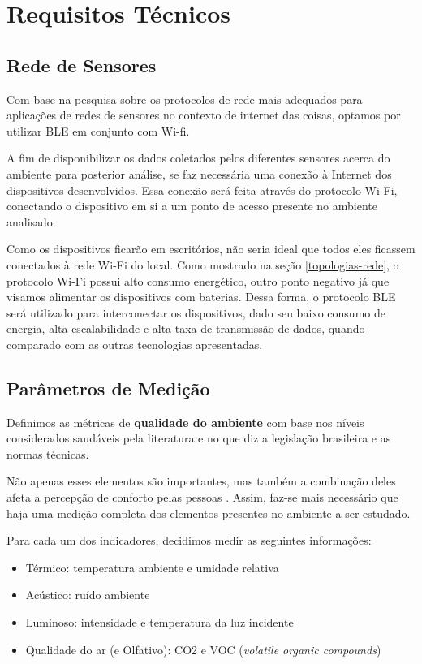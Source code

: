 \documentclass[../monografia.tex]{subfiles}
\begin{document}
\section{Requisitos Técnicos}

\subsection{Rede de Sensores}

Com base na pesquisa sobre os protocolos de rede mais adequados para aplicações de redes de sensores no contexto de internet das coisas, optamos por utilizar BLE em conjunto com Wi-fi. 

A fim de disponibilizar os dados coletados pelos diferentes sensores acerca do ambiente para posterior análise, se faz necessária uma conexão à Internet dos dispositivos desenvolvidos. Essa conexão será feita através do protocolo Wi-Fi, conectando o dispositivo em si a um ponto de acesso presente no ambiente analisado.

Como os dispositivos ficarão em escritórios, não seria ideal que todos eles ficassem conectados à rede Wi-Fi do local. Como mostrado na seção \ref{topologias-rede}, o protocolo Wi-Fi possui alto consumo energético, outro ponto negativo já que visamos alimentar os dispositivos com baterias. Dessa forma, o protocolo BLE será utilizado para interconectar os dispositivos, dado seu baixo consumo de energia, alta escalabilidade e alta taxa de transmissão de dados, quando comparado com as outras tecnologias apresentadas.

\subsection{Parâmetros de Medição}

Definimos as métricas de \textbf{qualidade do ambiente} com base nos níveis considerados saudáveis pela literatura e no que diz a legislação brasileira e as normas técnicas. 

Não apenas esses elementos são importantes, mas também a combinação deles afeta a percepção de conforto pelas pessoas \cite{ComfortOffice}. Assim, faz-se mais necessário que haja uma medição completa dos elementos presentes no ambiente a ser estudado.  

Para cada um dos indicadores, decidimos medir as seguintes informações:

\begin{itemize}
\item Térmico: temperatura ambiente e umidade relativa
\item Acústico: ruído ambiente
\item Luminoso: intensidade e temperatura da luz incidente
\item Qualidade do ar (e Olfativo): CO2 e VOC (\textit{volatile organic compounds})
\end{itemize}
\end{document}
